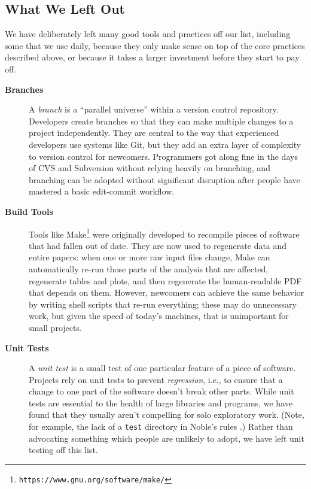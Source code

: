 \documentclass[10pt,letterpaper]{article}
\newcommand{\withurl}[2]{{#1}\footnote{{\texttt{#2}}}}
\begin{document}
\subsection*{What We Left Out}\label{sec:omitted}

We have deliberately left many good tools and practices off our list,
including some that we use daily, because they only make sense on top
of the core practices described above, or because it takes a larger
investment before they start to pay off.

\begin{description}

\item[\textbf{Branches}] A \emph{branch} is a ``parallel universe''
  within a version control repository. Developers create branches so
  that they can make multiple changes to a project independently. They
  are central to the way that experienced developers use systems like
  Git, but they add an extra layer of complexity to version control
  for newcomers.  Programmers got along fine in the days of CVS and
  Subversion without relying heavily on branching, and branching can
  be adopted without significant disruption after people have mastered
  a basic edit-commit workflow.

\item[\textbf{Build Tools}] Tools like
  \withurl{Make}{https://www.gnu.org/software/make/} were originally
  developed to recompile pieces of software that had fallen out of
  date. They are now used to regenerate data and entire papers: when
  one or more raw input files change, Make can automatically re-run
  those parts of the analysis that are affected, regenerate tables and
  plots, and then regenerate the human-readable PDF that depends on
  them.  However, newcomers can achieve the same behavior by writing
  shell scripts that re-run everything; these may do unnecessary work,
  but given the speed of today's machines, that is unimportant for
  small projects.

\item[\textbf{Unit Tests}] A \emph{unit test} is a small test of one
  particular feature of a piece of software. Projects rely on unit
  tests to prevent \emph{regression}, i.e., to ensure that a change to
  one part of the software doesn't break other parts. While unit tests
  are essential to the health of large libraries and programs, we have
  found that they usually aren't compelling for solo exploratory
  work. (Note, for example, the lack of a \texttt{test} directory in
  Noble's rules \cite{noble2009}.)  Rather than advocating something
  which people are unlikely to adopt, we have left unit testing off
  this list.


\end{description}
\end{document}
